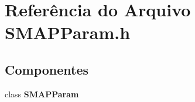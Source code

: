 \section{Referência do Arquivo S\+M\+A\+P\+Param.\+h}
\label{_s_m_a_p_param_8h}
\subsection*{Componentes}
\begin{DoxyCompactItemize}
\item 
class {\bf S\+M\+A\+P\+Param}
\end{DoxyCompactItemize}
